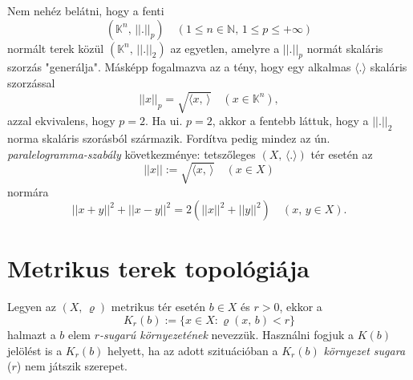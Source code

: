 \documentclass[12pt]{article}
\newcommand{\N}{\mathbb{N}}
\newcommand{\K}{\mathbb{K}}
\begin{document}
    Nem nehéz belátni, hogy a fenti
    \[
        (\K^n, \, ||.||_p) \quad (1 \leq n \in \N, \, 1 \leq p \leq + \infty)
    \]
    normált terek közül $(\K^n, \, ||.||_2)$ az egyetlen, amelyre a $||.||_p$ normát skaláris szorzás "generálja". Másképp fogalmazva az a tény, hogy egy alkalmas $\langle . \rangle$ skaláris szorzással
    \[
        ||x||_p = \sqrt{\langle x, \, \rangle} \quad (x \in \K^n),
    \]
    azzal ekvivalens, hogy $p=2$. Ha ui. $p=2$, akkor a fentebb láttuk, hogy a $||.||_2$ norma skaláris szorásból származik. Fordítva pedig mindez az ún. \textit{paralelogramma-szabály} következménye: tetszőleges $(X, \, \langle . \rangle)$ tér esetén az
    \[
        ||x|| := \sqrt{\langle x, \, \rangle} \quad (x \in X)
    \]
    normára
    \[
        ||x+y||^2 + ||x-y||^2 = 2(||x||^2 + ||y||^2) \quad (x, \, y \in X).
    \]
    \newpage
    

    \section{Metrikus terek topológiája}
    Legyen az $(X, \, \varrho)$ metrikus tér esetén $b \in X$ és $r > 0$, ekkor a
    \[
        K_r(b) := \{ x \in X : \varrho(x, \, b) < r \}
    \]
    halmazt a $b$ elem $r$\textit{-sugarú környezetének} nevezzük. Használni fogjuk a $K(b)$ jelölést is a $K_r(b)$ helyett, ha az adott szituációban a $K_r(b)$ \textit{környezet sugara} ($r$) nem játszik szerepet.\\
\end{document}
